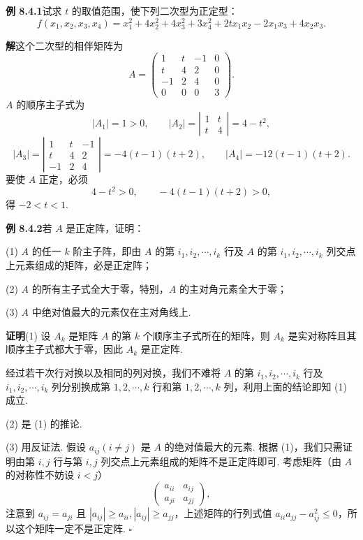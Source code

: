 \documentclass[UTF8,12pt,a4paper,fontset=fandol]{ctexart}
\begin{document}
\noindent\textbf{例 8.4.1}\quad 试求 $t$ 的取值范围，使下列二次型为正定型：
\[
f(x_1,x_2,x_3,x_4)=x_1^2+4x_2^2+4x_3^2+3x_4^2+2tx_1x_2-2x_1x_3+4x_2x_3.
\]

\noindent\textbf{解}\quad 这个二次型的相伴矩阵为
\[
A=\left(\begin{array}{rrrr}
1&t&-1&0\\
t&4&2&0\\
-1&2&4&0\\
0&0&0&3
\end{array}\right).
\]
$A$ 的顺序主子式为
\[
|A_1|=1>0,\qquad |A_2|=\left|\begin{array}{cc}1&t\\ t&4\end{array}\right|=4-t^2,
\]
\[
|A_3|=\left|\begin{array}{rrr}
1&t&-1\\
t&4&2\\
-1&2&4
\end{array}\right|=-4(t-1)(t+2),\qquad |A_4|=-12(t-1)(t+2).
\]
要使 $A$ 正定，必须
\[
4-t^2>0,\qquad -4(t-1)(t+2)>0,
\]
得 $-2<t<1$.

\noindent\textbf{例 8.4.2}\quad 若 $A$ 是正定阵，证明：

(1) $A$ 的任一 $k$ 阶主子阵，即由 $A$ 的第 $i_1,i_2,\cdots,i_k$ 行及 $A$ 的第 $i_1,i_2,\cdots,i_k$ 列交点上元素组成的矩阵，必是正定阵；

(2) $A$ 的所有主子式全大于零，特别，$A$ 的主对角元素全大于零；

(3) $A$ 中绝对值最大的元素仅在主对角线上.

\noindent\textbf{证明}\quad (1) 设 $A_k$ 是矩阵 $A$ 的第 $k$ 个顺序主子式所在的矩阵，则 $A_k$ 是实对称阵且其顺序主子式都大于零，因此 $A_k$ 是正定阵.

经过若干次行对换以及相同的列对换，我们不难将 $A$ 的第 $i_1,i_2,\cdots,i_k$ 行及 $i_1,i_2,\cdots,i_k$ 列分别换成第 $1,2,\cdots,k$ 行和第 $1,2,\cdots,k$ 列，利用上面的结论即知 (1) 成立.

(2) 是 (1) 的推论.

(3) 用反证法. 假设 $a_{ij}(i\ne j)$ 是 $A$ 的绝对值最大的元素. 根据 (1)，我们只需证明由第 $i,j$ 行与第 $i,j$ 列交点上元素组成的矩阵不是正定阵即可. 考虑矩阵（由 $A$ 的对称性不妨设 $i<j$）
\[
\left(\begin{array}{cc}a_{ii}&a_{ij}\\ a_{ji}&a_{jj}\end{array}\right),
\]
注意到 $a_{ij}=a_{ji}$ 且 $|a_{ij}|\geq a_{ii}, |a_{ij}|\geq a_{jj}$，上述矩阵的行列式值 $a_{ii}a_{jj}-a_{ij}^2\leq 0$，所以这个矩阵一定不是正定阵. $\square$
\end{document}
